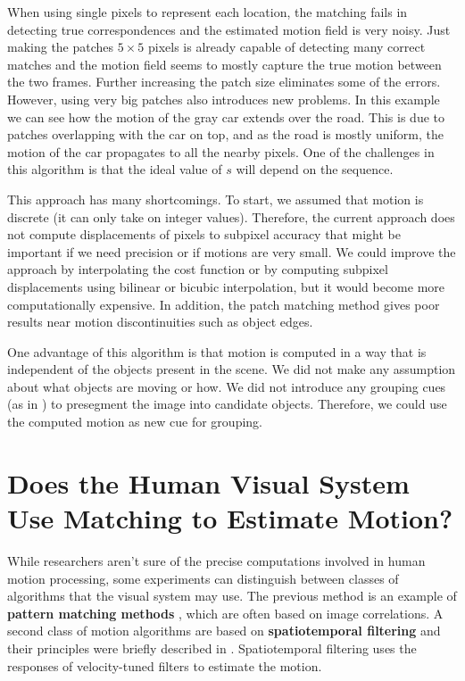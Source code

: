 When using single pixels to represent each location, the matching fails in detecting true correspondences and the estimated motion field is very noisy. Just making the patches $5 \times 5$ pixels is already capable of detecting many correct matches and the motion field seems to mostly capture the true motion between the two frames. Further increasing the patch size eliminates some of the errors. However, using very big patches also introduces new problems. In this example we can see how the motion of the gray car extends over the road. This is due to patches overlapping with the car on top, and as the road is mostly uniform, the motion of the car propagates to all the nearby pixels. One of the challenges in this algorithm is that the ideal value of $s$ will depend on the sequence.  


This approach has many shortcomings. To start, we assumed that motion is discrete (it can only take on integer values). Therefore, the current approach does not compute displacements of pixels to subpixel accuracy that might be important if we need precision or if motions are very small. We could improve the approach by interpolating the cost function or by computing subpixel displacements using bilinear or bicubic interpolation, but it would become more computationally expensive. In addition, the patch matching method gives poor results near motion discontinuities such as object edges.


One advantage of this algorithm is that motion is computed in a way that is independent of the objects present in the scene. We did not make any assumption about what objects are moving or how. We did not introduce any grouping cues (as in \chap{\ref{chapter:perceptual_organization}}) to presegment the image into candidate objects. Therefore, we could use the computed motion as new cue for grouping. 



\section{Does the Human Visual System Use Matching to Estimate Motion?}

While researchers aren't sure of the precise computations involved in human motion processing, some experiments can distinguish between classes of algorithms that the visual system may use.  The previous method is an example of {\bf pattern matching methods} \cite{Adelson85}, which are often based on image correlations. A second class of motion algorithms are based on {\bf spatiotemporal filtering} \cite{Adelson85} and their principles were briefly described in \chap{\ref{chapter:filter_banks}}. Spatiotemporal filtering uses the responses of velocity-tuned filters to estimate the motion.

